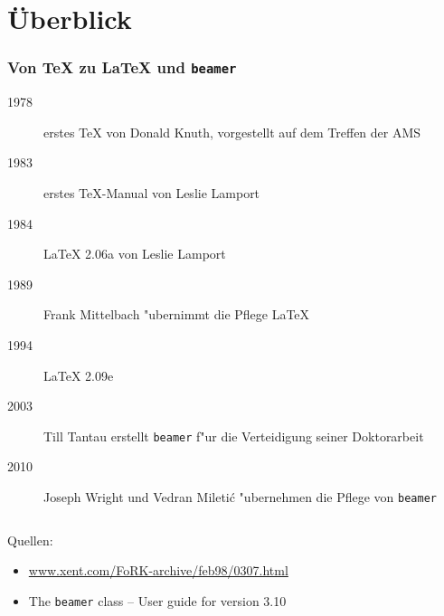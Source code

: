 \section{\"Uberblick}

\begin{frame}[t] \frametitle{Von \TeX{} zu \LaTeX{} und \texttt{beamer}}
  \begin{description}
    \item[1978] erstes \TeX{} von Donald Knuth, vorgestellt auf 
                dem Treffen der AMS
    \item[1983] erstes \TeX{}-Manual von Leslie Lamport
    \item[1984] \LaTeX{} 2.06a von Leslie Lamport
    \item[1989] Frank Mittelbach "ubernimmt die Pflege \LaTeX{}
    \item[1994] \LaTeX{} 2.09e
    \item[2003] Till Tantau erstellt \texttt{beamer} f"ur die 
                Verteidigung seiner Doktorarbeit
    \item[2010] Joseph Wright und Vedran Mileti{\'c} "ubernehmen die 
                Pflege von \texttt{beamer}
  \end{description}

  \vskip 4mm
  \begin{columns}
    \begin{column}{0.7\textwidth}
      {\footnotesize \textsf{Quellen:}
        \begin{itemize} 
          \item \href{http://www.xent.com/FoRK-archive/feb98/0307.html}{www.xent.com/FoRK-archive/feb98/0307.html}
          \item The \texttt{beamer} class -- User guide for version 3.10
        \end{itemize}
      }
    \end{column}
  \end{columns}
\end{frame}


